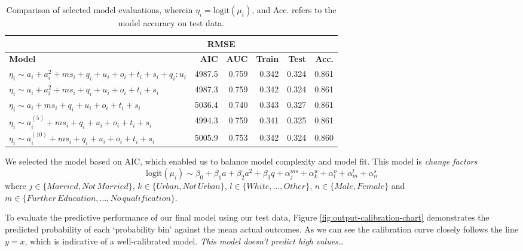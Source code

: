 \documentclass[
  11pt,
  twocolumn]{article}
\begin{document}
\begin{table}

\caption{\label{tab:outputmodelselectiontable}Comparison of selected model evaluations, wherein $\eta_i = \text{logit}(\mu_i)$, and Acc. refers to the model accuracy on test data.\label{tab:output-model-selection-table}}
\centering
\begin{tabular}[t]{>{\raggedright\arraybackslash}p{7em}|r|r|r|r|r}
\hline
\multicolumn{3}{c|}{ } & \multicolumn{2}{c|}{RMSE} & \multicolumn{1}{c}{ } \\
\cline{4-5}
\textbf{Model} & \textbf{AIC} & \textbf{AUC} & \textbf{Train} & \textbf{Test} & \textbf{Acc.}\\
\hline
$\eta_i \sim a_i + a_i^2 + ms_i + q_i + u_i + o_i + t_i + s_i + q_i:u_i$ & 4987.5 & 0.759 & 0.342 & 0.324 & 0.861\\
\hline
$\eta_i \sim a_i + a_i^2 + ms_i + q_i + u_i + o_i + t_i + s_i$ & 4987.3 & 0.759 & 0.342 & 0.324 & 0.861\\
\hline
$\eta_i \sim a_i + ms_i + q_i + u_i + o_i + t_i + s_i$ & 5036.4 & 0.740 & 0.343 & 0.327 & 0.861\\
\hline
$\eta_i \sim a_i^{(5)} + ms_i + q_i + u_i + o_i + t_i + s_i$ & 4994.3 & 0.759 & 0.341 & 0.325 & 0.861\\
\hline
$\eta_i \sim a_i^{(10)} + ms_i + q_i + u_i + o_i + t_i + s_i$ & 5005.9 & 0.753 & 0.342 & 0.324 & 0.860\\
\hline
\end{tabular}
\end{table}

We selected the model based on AIC, which enabled us to balance model
complexity and model fit. This model is \emph{change factors}
\[\text{logit}(\mu_i) \sim \beta_0 + \beta_1a + \beta_2a^2 + \beta_3q + \alpha^{ms}_j + \alpha^{u}_k + \alpha^{o}_l + \alpha^{t}_m + \alpha^{s}_n\]
where \(j \in \{Married,Not\,Married\}\),
\(k \in \{Urban,Not\,Urban\}\), \(l \in \{White,...,Other\}\),
\(n \in \{Male,Female\}\) and
\(m \in \{Further\,Education,...,No\,qualification\}\).

To evaluate the predictive performance of our final model using our test
data, Figure \ref{fig:output-calibration-chart} demonstrates the
predicted probability of each `probability bin' against the mean actual
outcomes. As we can see the calibration curve closely follows the line
\(y = x\), which is indicative of a well-calibrated model. \emph{This
model doesn't predict high values\ldots{}}
\end{document}
